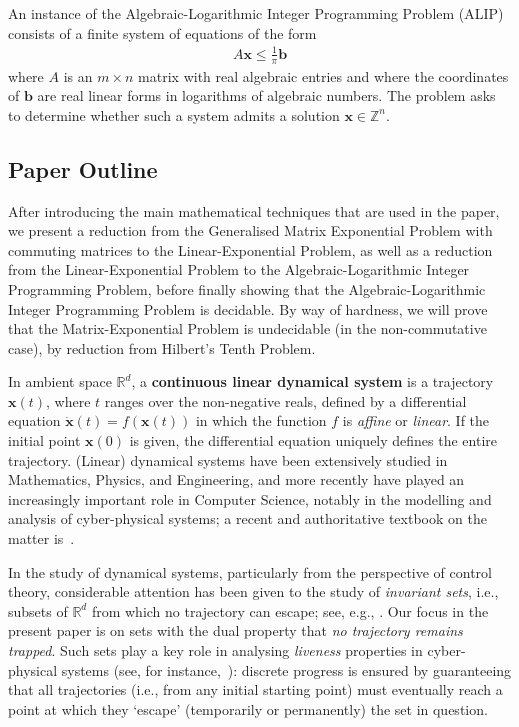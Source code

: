 \begin{definition}
An instance of the Algebraic-Logarithmic Integer Programming Problem (ALIP) consists of a finite system of equations of the form
\begin{align*}
A \boldsymbol{x} \leq \frac{1}{\pi} \boldsymbol{b}
\end{align*}
where $A$ is an $m\times n$ matrix with real algebraic entries and
where the coordinates of $\boldsymbol{b}$ are real linear forms in
logarithms of algebraic numbers. The problem asks to determine whether
such a system admits a solution $\boldsymbol{x} \in \mathbb{Z}^{n}$.
\end{definition}

\subsection{Paper Outline}

After introducing the main mathematical techniques that are used in
the paper, we present a reduction from the Generalised Matrix
Exponential Problem with commuting matrices to the Linear-Exponential
Problem, as well as a reduction from the Linear-Exponential Problem to
the Algebraic-Logarithmic Integer Programming Problem, before finally showing that the Algebraic-Logarithmic Integer Programming Problem is decidable. By way of hardness, we will prove that the Matrix-Exponential Problem is
undecidable (in the non-commutative case), by reduction from Hilbert's
Tenth Problem.


In ambient space $\mathbb{R}^{d}$, a \textbf{continuous linear
  dynamical system} is a trajectory $\boldsymbol{x}(t)$, where $t$
ranges over the non-negative reals, defined by a differential equation
$\dot{\boldsymbol{x}}(t)=f(\boldsymbol{x}(t))$ in which the function
$f$ is \emph{affine} or \emph{linear}. If the initial point
$\boldsymbol{x}(0)$ is given, the differential equation uniquely
defines the entire trajectory. (Linear) dynamical systems have been
extensively studied in Mathematics, Physics, and Engineering, and more
recently have played an increasingly important role in Computer
Science, notably in the modelling and analysis of cyber-physical
systems; a recent and authoritative textbook on the matter
is~\cite{Alu15}.

In the study of dynamical systems, particularly from the perspective
of control theory, considerable attention has been given to the study
of \emph{invariant sets}, i.e., subsets of $\mathbb{R}^{d}$ from which
no trajectory can escape; see, e.g.,
\cite{CastelanH92,BlondelT00,BM07,SDI08}. Our focus in the present
paper is on sets with the dual property that \emph{no trajectory
  remains trapped}. Such sets play a key role in analysing
\emph{liveness} properties in cyber-physical systems (see, for
instance,~\cite{Alu15}): discrete progress is ensured by
guaranteeing that all trajectories (i.e., from any initial starting
point) must eventually reach a point at which they `escape'
(temporarily or permanently) the set in question.

